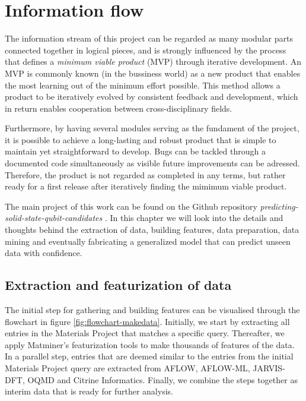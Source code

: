 \chapter{Information flow}

The information stream of this project can be regarded as many modular parts connected together in logical pieces, and is strongly influenced by the process that defines a \textit{minimum viable product} (MVP) through iterative development. An MVP is commonly known (in the bussiness world) as a new product that enables the most learning out of the minimum effort possible. This method allows a product to be iteratively evolved by consistent feedback and development, which in return enables cooperation between cross-disciplinary fields.

Furthermore, by having several modules serving as the fundament of the project, it is possible to achieve a long-lasting and robust product that is simple to maintain yet straightforward to develop. Bugs can be tackled through a documented code simultaneously as visible future improvements can be adressed. Therefore, the product is not regarded as completed in any terms, but rather ready for a first release after iteratively finding the mimimum viable product.

The main project of this work can be found on the Github repository \textit{predicting-solid-state-qubit-candidates} \cite{Ohebbi2021}. In this chapter we will look into the details and thoughts behind the extraction of data, building features, data preparation, data mining and eventually fabricating a generalized model that can predict unseen data with confidence.

\section{Extraction and featurization of data}

The initial step for gathering and building features can be visualised through the flowchart in figure \ref{fig:flowchart-makedata}. Initially, we start by extracting all entries in the Materials Project that matches a specific query. Thereafter, we apply Matminer's featurization tools to make thousands of features of the data. In a parallel step, entries that are deemed similar to the entries from the initial Materials Project query are extracted from AFLOW, AFLOW-ML, JARVIS-DFT, OQMD and Citrine Informatics. Finally, we combine the steps together as interim data that is ready for further analysis.

